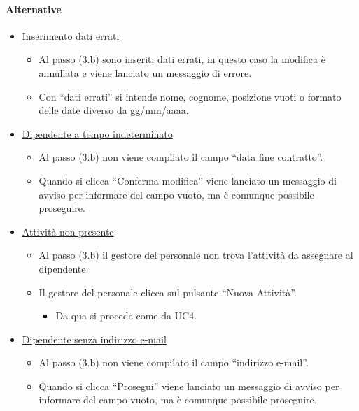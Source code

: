 \paragraph{Alternative}
\begin{itemize}
	\item \underline{Inserimento dati errati}
		\begin{itemize}
			\item Al passo (3.b) sono inseriti dati errati, in questo caso la modifica è annullata e viene lanciato un messaggio di errore. 
			\item Con “dati errati” si intende nome, cognome, posizione vuoti o formato delle date diverso da gg/mm/aaaa. 
		\end{itemize}
	\item \underline{Dipendente a tempo indeterminato}
		\begin{itemize}
			\item Al passo (3.b) non viene compilato il campo “data fine contratto”. 
			\item Quando si clicca “Conferma modifica” viene lanciato un messaggio di avviso per informare del campo vuoto, ma è comunque possibile proseguire. 
		\end{itemize}
	\item \underline{Attività non presente}
		\begin{itemize}
			\item Al passo (3.b) il gestore del personale non trova l'attività da assegnare al dipendente.
			\item Il gestore del personale clicca sul pulsante “Nuova Attività”.
				\begin{itemize}
					\item Da qua si procede come da UC4.
				\end{itemize}
		\end{itemize}
		\item \underline{Dipendente senza indirizzo e-mail}
		\begin{itemize}
			\item Al passo (3.b) non viene compilato il campo “indirizzo e-mail”. 
			\item Quando si clicca “Prosegui” viene lanciato un messaggio di avviso per informare del campo vuoto, ma è comunque possibile proseguire. 
		\end{itemize}
\end{itemize}
